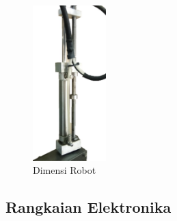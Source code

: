 \begin{figure}[H]
	\centering
	\includegraphics[height=6cm]{gambar/penuamticsementara.jpg}
	\caption{Dimensi Robot}
	\label{pic.scaradimensi}
\end{figure}

\subsection{Rangkaian Elektronika}
